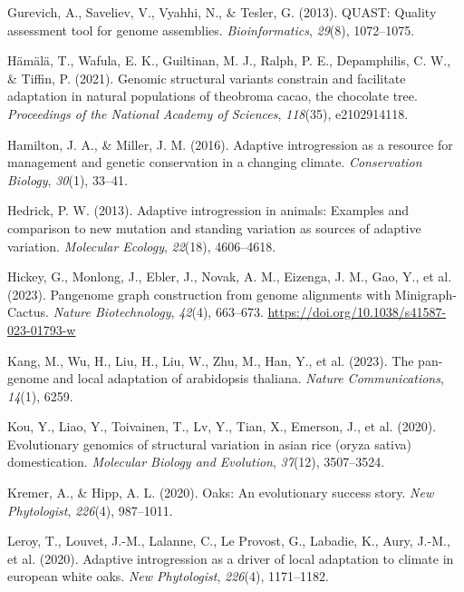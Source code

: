 \documentclass[
]{agujournal2019}
\newlength{\cslhangindent}
\newenvironment{CSLReferences}[2] %
 {\begin{list}{}{%
  \setlength{\itemindent}{0pt}
  \setlength{\leftmargin}{0pt}
  \setlength{\parsep}{0pt}
  \ifodd #1
   \setlength{\leftmargin}{\cslhangindent}
   \setlength{\itemindent}{-1\cslhangindent}
  \fi
  \setlength{\itemsep}{#2\baselineskip}}}
 {\end{list}}
\begin{document}
\begin{CSLReferences}{1}{0}
Gurevich, A., Saveliev, V., Vyahhi, N., \& Tesler, G. (2013). QUAST:
Quality assessment tool for genome assemblies. \emph{Bioinformatics},
\emph{29}(8), 1072--1075.

Hämälä, T., Wafula, E. K., Guiltinan, M. J., Ralph, P. E., Depamphilis,
C. W., \& Tiffin, P. (2021). Genomic structural variants constrain and
facilitate adaptation in natural populations of theobroma cacao, the
chocolate tree. \emph{Proceedings of the National Academy of Sciences},
\emph{118}(35), e2102914118.

Hamilton, J. A., \& Miller, J. M. (2016). Adaptive introgression as a
resource for management and genetic conservation in a changing climate.
\emph{Conservation Biology}, \emph{30}(1), 33--41.

Hedrick, P. W. (2013). Adaptive introgression in animals: Examples and
comparison to new mutation and standing variation as sources of adaptive
variation. \emph{Molecular Ecology}, \emph{22}(18), 4606--4618.

Hickey, G., Monlong, J., Ebler, J., Novak, A. M., Eizenga, J. M., Gao,
Y., et al. (2023). Pangenome graph construction from genome alignments
with Minigraph-Cactus. \emph{Nature Biotechnology}, \emph{42}(4),
663--673. \url{https://doi.org/10.1038/s41587-023-01793-w}

Kang, M., Wu, H., Liu, H., Liu, W., Zhu, M., Han, Y., et al. (2023). The
pan-genome and local adaptation of arabidopsis thaliana. \emph{Nature
Communications}, \emph{14}(1), 6259.

Kou, Y., Liao, Y., Toivainen, T., Lv, Y., Tian, X., Emerson, J., et al.
(2020). Evolutionary genomics of structural variation in asian rice
(oryza sativa) domestication. \emph{Molecular Biology and Evolution},
\emph{37}(12), 3507--3524.

Kremer, A., \& Hipp, A. L. (2020). Oaks: An evolutionary success story.
\emph{New Phytologist}, \emph{226}(4), 987--1011.

Leroy, T., Louvet, J.-M., Lalanne, C., Le Provost, G., Labadie, K.,
Aury, J.-M., et al. (2020). Adaptive introgression as a driver of local
adaptation to climate in european white oaks. \emph{New Phytologist},
\emph{226}(4), 1171--1182.


\end{CSLReferences}
\end{document}
